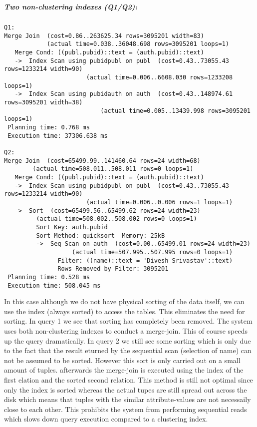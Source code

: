 \documentclass[11pt]{scrartcl}
\begin{document}
\\
\subparagraph{Two non-clustering indexes (Q1/Q2):}
{\small
\begin{verbatim}
Q1:
Merge Join  (cost=0.86..263625.34 rows=3095201 width=83)
            (actual time=0.038..36048.698 rows=3095201 loops=1)
   Merge Cond: ((publ.pubid)::text = (auth.pubid)::text)
   ->  Index Scan using pubidpubl on publ  (cost=0.43..73055.43 rows=1233214 width=90)
					   (actual time=0.006..6608.030 rows=1233208 loops=1)
   ->  Index Scan using pubidauth on auth  (cost=0.43..148974.61 rows=3095201 width=38)
				           (actual time=0.005..13439.998 rows=3095201 loops=1)
 Planning time: 0.768 ms
 Execution time: 37306.638 ms

Q2:
Merge Join  (cost=65499.99..141460.64 rows=24 width=68)
	    (actual time=508.011..508.011 rows=0 loops=1)
   Merge Cond: ((publ.pubid)::text = (auth.pubid)::text)
   ->  Index Scan using pubidpubl on publ  (cost=0.43..73055.43 rows=1233214 width=90)
					   (actual time=0.006..0.006 rows=1 loops=1)
   ->  Sort  (cost=65499.56..65499.62 rows=24 width=23)
	     (actual time=508.002..508.002 rows=0 loops=1)
         Sort Key: auth.pubid
         Sort Method: quicksort  Memory: 25kB
         ->  Seq Scan on auth  (cost=0.00..65499.01 rows=24 width=23)
			       (actual time=507.995..507.995 rows=0 loops=1)
               Filter: ((name)::text = 'Divesh Srivastav'::text)
               Rows Removed by Filter: 3095201
 Planning time: 0.528 ms
 Execution time: 508.045 ms
\end{verbatim}
In this case although we do not have physical sorting of the data itself, we can use the index (always sorted) to access the tables. This eliminates the need for sorting.
In query 1 we see that sorting has completely been removed. The system uses both non-clustering indexes to conduct a merge-join. This of course speeds up the query dramatically.
In query 2 we still see some sorting which is only due to the fact that the result eturned by the sequential scan (selection of name) can not be assumed to be sorted. However this sort
is only carried out on a small amount of tuples. afterwards the merge-join is executed using the index of the first elation and the sorted second relation.
This method is still not optimal since only the index is sorted whereas the actual tupes are still spread out across the disk which means that tuples with the similar attribute-values are not necessaily
close to each other. This prohibits the system from performing sequential reads which slows down query execution compared to a clustering index.
}
\end{document}
